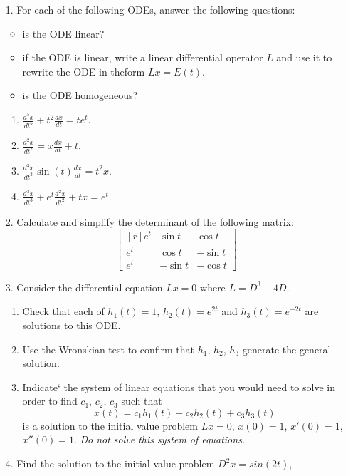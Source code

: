 \documentclass[12pt]{amsart}
\newcommand{\e}{{\varepsilon}} %
\begin{document}
\begin{enumerate}[1.]
  \setlength{\itemsep}{5mm}

\item[1.] For each of the following ODEs, answer the following questions:
  \begin{itemize}
  \item is the ODE linear?
  \item if the ODE is linear, write a linear differential operator \(L\) and use it to rewrite the ODE in theform \(Lx= E(t)\).
  \item is the ODE homogeneous?
  \end{itemize}    
  \begin{enumerate}
  \item\(\displaystyle\frac{d^5x}{dt^5}+t^2\frac{dx}{dt}=te^t\).
  \item\(\displaystyle\frac{d^2x}{dt^2}=x\frac{dx}{dt}+t\).
  \item\(\displaystyle\frac{d^3x}{dt^3}\sin(t)\frac{dx}{dt}=t^2x\).
  \item\(\displaystyle\frac{d^3x}{dt^3}+e^t\frac{d^2x}{dt^2}+tx=e^t\).
  \end{enumerate}
\item[2.] Calculate and simplify the determinant of the following matrix:
  \[\begin{bmatrix*}[r]e^t&\sin t&\cos t\\e^t&\cos t&-\sin t\\e^t&-\sin t&-\cos t\end{bmatrix*}\]
\item[3.] Consider the differential equation \(Lx = 0\) where \(L= D^3- 4D\).
  \begin{enumerate}
  \item Check that each of \(h_1(t) = 1\), \(h_2(t) = e^{2t}\) and
    \(h_3(t) = e^{-2t}\) are solutions to this ODE.
  \item Use the Wronskian test to confirm that \(h_1\), \(h_2\), \(h_3\) generate the general solution.
  \item Indicate` the system of linear equations that you would need to solve in order to find \(c_1\), \(c_2\), \(c_3\) such that
    \[
      x(t) = c_1h_1(t) + c_2h_2(t) + c_3h_3(t)
    \]
    is a solution to the initial value problem \(Lx = 0\), \(x(0) = 1\),
    \(x'(0) = 1\), \(x''(0) = 1\).
    \newline\emph{Do not solve this system of equations.}
  \end{enumerate}
  \eject\item[4.] Find the solution to the initial value problem \(D^2x =sin(2t)\),

\end{enumerate}
\end{document}
